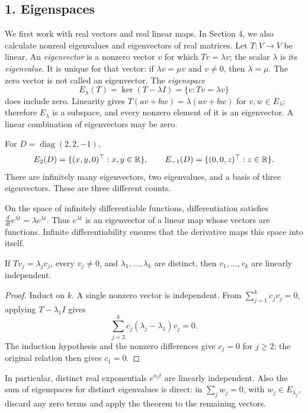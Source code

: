 
\subsection*{1. Eigenspaces}
We first work with real vectors and real linear maps. In Section 4,
we also calculate nonreal eigenvalues and eigenvectors of real matrices.
Let \(T:V\to V\) be linear. An \emph{eigenvector} is a nonzero vector
\(v\) for which \(Tv=\lambda v\); the scalar \(\lambda\) is its
\emph{eigenvalue}. It is unique for that vector: if
\(\lambda v=\mu v\) and \(v\ne0\), then \(\lambda=\mu\).
The zero vector is not called an eigenvector. The \emph{eigenspace}
\[
 E_\lambda(T)=\ker(T-\lambda I)=\{v:Tv=\lambda v\}
\]
does include zero. Linearity gives
\(T(av+bw)=\lambda(av+bw)\) for \(v,w\in E_\lambda\); therefore
\(E_\lambda\) is a subspace, and every nonzero element of it is an
eigenvector. A linear combination of eigenvectors may be zero.

\begin{example}
For \(D=\operatorname{diag}(2,2,-1)\),
\[
 E_2(D)=\{(x,y,0)^\top:x,y\in\mathbb R\},\qquad
 E_{-1}(D)=\{(0,0,z)^\top:z\in\mathbb R\}.
\]
There are infinitely many eigenvectors, two eigenvalues, and a basis of
three eigenvectors. These are three different counts.

On the space of infinitely differentiable functions, differentiation
satisfies \(\frac{d}{dt}e^{\lambda t}=\lambda e^{\lambda t}\).
Thus \(e^{\lambda t}\) is an eigenvector of a linear map whose vectors are
functions. Infinite differentiability ensures that the derivative maps
this space into itself.
\end{example}

\begin{theorem}
If \(Tv_j=\lambda_jv_j\), every \(v_j\ne0\), and
\(\lambda_1,\ldots,\lambda_k\) are distinct, then \(v_1,\ldots,v_k\)
are linearly independent.
\end{theorem}
\begin{proof}
Induct on \(k\). A single nonzero vector is independent.
From \(\sum_{j=1}^k c_jv_j=0\), applying \(T-\lambda_1I\) gives
\[
 \sum_{j=2}^k c_j(\lambda_j-\lambda_1)v_j=0.
\]
The induction hypothesis and the nonzero differences give \(c_j=0\)
for \(j\geqslant2\); the original relation then gives \(c_1=0\).
\end{proof}
In particular, distinct real exponentials \(e^{\alpha_jt}\) are linearly
independent. Also the sum of eigenspaces for distinct eigenvalues is
direct: in \(\sum_j w_j=0\), with \(w_j\in E_{\lambda_j}\), discard any
zero terms and apply the theorem to the remaining vectors.


